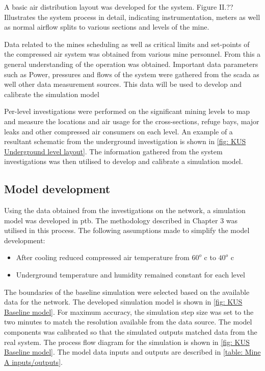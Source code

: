 \clearpage
A basic air distribution layout was developed for the system.  Figure  II.?? Illustrates the system process in detail, indicating instrumentation, meters as well as normal airflow splits to various sections and levels of the mine.
\par 
 Data related to the mines scheduling as well as critical limits and set-points of the compressed air system was obtained from various mine personnel.  From this a general understanding of the operation was obtained. Important data parameters such as Power, pressures and flows of the system were gathered from the \gls{scada} as well other data measurement sources. This data will be used to develop and calibrate the simulation model
\par 
		
Per-level investigations were performed on the significant mining levels to map and measure the locations and air usage for the cross-sections, refuge bays, major leaks and other compressed air consumers on each level. An example of a resultant schematic from the underground investigation is shown in \cref{fig: KUS Underground level layout}.  The information gathered from the system investigations was then utilised to develop and calibrate a simulation model.
	
\subsection{Model development}
	
Using the data obtained from the investigations on the network, a simulation model was developed in \gls{ptb}. The methodology described in Chapter 3 was utilised in this process. The following assumptions made to simplify the model development:
\begin{itemize}
	\item After cooling reduced compressed air temperature from $ 60 ^o $ \gls{c} to $ 40 ^o $ \gls{c}
	\item Underground temperature and humidity remained constant for each level
\end{itemize}
 The boundaries of the baseline simulation were selected based on the available data for the network. The developed simulation model is shown in \cref{fig: KUS Baseline model}. For maximum accuracy, the simulation step size was set to the two minutes to match the resolution available from the data source.
The model components was calibrated so that the simulated outputs matched data from the real system. The process flow diagram for the simulation is shown in \cref{fig: KUS Baseline model}. The model data inputs and outputs are described in \cref{table: Mine A inputs/outputs}.

